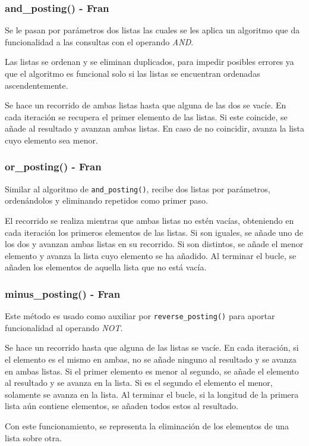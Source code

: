 \documentclass[12pt,a4paper]{article}
\begin{document}
\subsubsection{and\_posting() - Fran}
Se le pasan por parámetros dos listas las cuales se les aplica un algoritmo que da funcionalidad a las consultas con el operando \textit{AND}.

Las listas se ordenan y se eliminan duplicados, para impedir posibles errores ya que el algoritmo es funcional solo si las listas se encuentran ordenadas ascendentemente.

Se hace un recorrido de ambas listas hasta que alguna de las dos se vacíe. En cada iteración se recupera el primer elemento de las listas. Si este coincide, se añade al resultado y avanzan ambas listas. En caso de no coincidir, avanza la lista cuyo elemento sea menor.

\subsubsection{or\_posting() - Fran}
Similar al algoritmo de \texttt{and\_posting()}, recibe dos listas por parámetros, ordenándolos y eliminando repetidos como primer paso.

El recorrido se realiza mientras que ambas listas no estén vacías, obteniendo en cada iteración los primeros elementos de las listas. Si son iguales, se añade uno de los dos y avanzan ambas listas en su recorrido. Si son distintos, se añade el menor elemento y avanza la lista cuyo elemento se ha añadido. Al terminar el bucle, se añaden los elementos de aquella lista que no está vacía.

\subsubsection{minus\_posting() - Fran}
Este método es usado como auxiliar por \texttt{reverse\_posting()} para aportar funcionalidad al operando \textit{NOT}.

Se hace un recorrido hasta que alguna de las listas se vacíe. En cada iteración, si el elemento es el mismo en ambas, no se añade ninguno al resultado y se avanza en ambas listas. Si el primer elemento es menor al segundo, se añade el elemento al resultado y se avanza en la lista. Si es el segundo el elemento el menor, solamente se avanza en la lista. Al terminar el bucle, si la longitud de la primera lista aún contiene elementos, se añaden todos estos al resultado.

Con este funcionamiento, se representa la eliminación de los elementos de una lista sobre otra.
\end{document}
